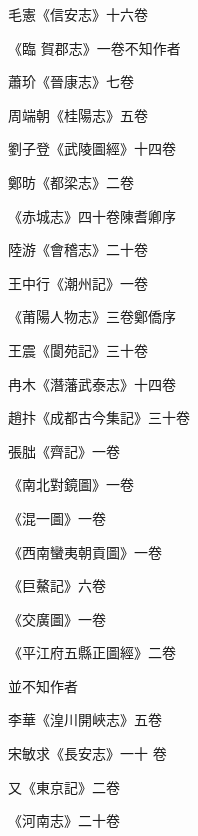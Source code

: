 \begin{pinyinscope}
 毛憲《信安志》十六卷



 《臨
 賀郡志》一卷不知作者



 蕭玠《晉康志》七卷



 周端朝《桂陽志》五卷



 劉子登《武陵圖經》十四卷



 鄭昉《都梁志》二卷



 《赤城志》四十卷陳耆卿序



 陸游《會稽志》二十卷



 王中行《潮州記》一卷



 《莆陽人物志》三卷鄭僑序



 王震《閬苑記》三十卷



 冉木《潛藩武泰志》十四卷



 趙抃《成都古今集記》三十卷



 張朏《齊記》一卷



 《南北對鏡圖》一卷



 《混一圖》一卷



 《西南蠻夷朝貢圖》一卷



 《巨鰲記》六卷



 《交廣圖》一卷



 《平江府五縣正圖經》二卷



 並不知作者



 李華《湟川開峽志》五卷



 宋敏求《長安志》一十
 卷



 又《東京記》二卷



 《河南志》二十卷




\end{pinyinscope}
